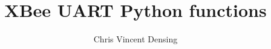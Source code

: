 \documentclass{beamer}
\title{XBee UART Python functions}
\author{Chris Vincent Densing}
\begin{document}
\frame{\titlepage}


\end{document}
